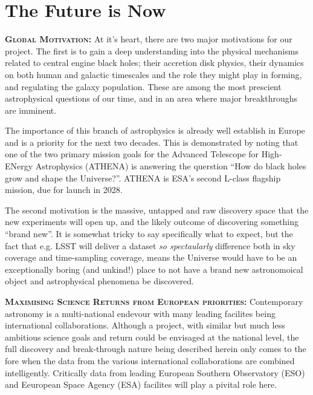 \documentclass[oneside, a4paper, onecolumn, 11pt]{article}
\begin{document}
\section*{The Future is Now}
\smallskip
\smallskip
\noindent
\textbf{\textsc{Global Motivation:}}
At it's heart, there are two major motivations for our project. 
The first is to gain a deep understanding into the physical mechanisms 
related to central engine black holes; their accretion disk physics, their 
dynamics on both human and galactic timescales and the role they might 
play in forming, and regulating the galaxy population. These are among the 
most prescient astrophysical questions of our time, and in an area where 
major breakthroughs are imminent. 

\smallskip
\smallskip
\noindent
The importance of this branch of astrophysics is already well establish in 
Europe and is a priority for the next two decades. This is demonstrated by noting that
one of the two primary mission goals for the Advanced Telescope for High-ENergy Astrophysics (ATHENA) is 
answering the querstion ``How do black holes grow and shape the Universe?''. 
ATHENA is ESA's second L-class flagship mission, due for launch in 2028.

\smallskip
\smallskip
\noindent
The second motivation is the massive, untapped and raw discovery space 
that the new experiments will open up, and the likely outcome of discovering 
something ``brand new''. It is somewhat tricky to say specifically what to 
expect, but the fact that e.g. LSST will deliver a dataset {\it so spectaularly} 
difference both in sky coverage and time-sampling coverage, means the 
Universe would have to be an exceptionally boring (and unkind!) place to 
not have a brand new astronomoical object and astrophysical phenomena 
be discovered. 


\smallskip
\smallskip
\noindent
\textbf{\textsc{Maximising Science Returns from European priorities:}}
Contemporary astronomy is a multi-national endevour with many leading facilites being 
international collaborations. Although a project, with similar but much less ambitious science 
goals and return could be envisaged at the national level, the full discovery and break-through nature being described herein only comes to the fore
when the data from the various international collaborations are combined intelligently. 
Critically data from leading  European Southern Observatory (ESO) and 
Eeuropean Space Agency (ESA) facilites will play a pivital role here. 
\end{document}
